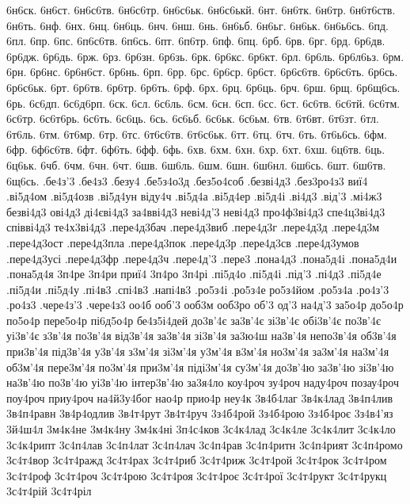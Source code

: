 {6н6ск. 6н6ст. 6н6с6тв. 6н6с6тр. 6н6с6ьк. 6н6с6ькй. 6нт. 6н6тк. 
6н6тр. 6н6т6ств. 6н6ть. 6нф. 6нх. 6нц. 6н6ць. 6нч. 
6нш. 6нь. 6н6ьб. 6н6ьг. 6н6ьк. 6н6ь6сь. 6пд. 6пл. 
6пр. 6пс. 6п6с6тв. 6п6сь. 6пт. 6п6тр. 6пф. 6пц. 
6рб. 6рв. 6рг. 6рд. 6р6дв. 6р6дж. 6р6дь. 6рж. 
6рз. 6р6зн. 6р6зь. 6рк. 6р6кс. 6р6кт. 6рл. 6р6ль. 
6р6л6ьз. 6рм. 6рн. 6р6нс. 6р6н6ст. 6р6нь. 6рп. 6рр. 
6рс. 6р6ср. 6р6ст. 6р6с6тв. 6р6с6ть. 6р6сь. 6р6с6ьк. 6рт. 
6р6тв. 6р6тр. 6р6ть. 6рф. 6рх. 6рц. 6р6ць. 6рч. 
6рш. 6рщ. 6р6щ6сь. 6рь. 6с6дп. 6с6д6рп. 6ск. 6сл. 
6с6ль. 6см. 6сн. 6сп. 6сс. 6ст. 6с6тв. 6с6тй. 
6с6тм. 6с6тр. 6с6т6рь. 6с6ть. 6с6ць. 6сь. 6с6ьб. 6с6ьк. 
6с6ьм. 6тв. 6т6вт. 6т6зт. 6тл. 6т6ль. 6тм. 6т6мр. 
6тр. 6тс. 6т6с6тв. 6т6с6ьк. 6тт. 6тц. 6тч. 6ть. 
6т6ь6сь. 6фм. 6фр. 6ф6с6тв. 6фт. 6ф6ть. 6фф. 6фь. 
6хв. 6хм. 6хн. 6хр. 6хт. 6хш. 6ц6тв. 6ць. 
6ц6ьк. 6чб. 6чм. 6чн. 6чт. 6шв. 6ш6ль. 6шм. 
6шн. 6ш6нл. 6ш6сь. 6шт. 6ш6тв. 6щ6сь. 
.бе4з'3
.бе4з3
.безу4
.бе5з4о3д
.без5о4соб
.безві4д3
.без3ро4з3
виї4
.ві5д4ом
.ві5д4озв
.ві5д4ун
віду4ч
.ві5д4а
.ві5д4ер
.ві5д4і
.ві4д3
.від'3
.мі4ж3
безві4д3
ові4д3
ді4єві4д3
за4вві4д3
неві4д'3
неві4д3
про4ф3ві4д3
спе4ц3ві4д3
співві4д3
те4х3ві4д3
.пере4д3бач
.пере4д3виб
.пере4д3г
.пере4д3д
.пере4д3м
.пере4д3ост
.пере4д3пла
.пере4д3пок
.пере4д3р
.пере4д3св
.пере4д3умов
.пере4д3усі
.пере4д3фр
.пере4д3ч
.пере4д'3
.пере3
.пона4д3
.пона5д4і
.пона5д4и
.пона5д4я
3п4ре
3п4ри
приї4
3п4ро
3п4рі
.пі5д4о
.пі5д4і
.під'3
.пі4д3
.пі5д4е
.пі5д4и
.пі5д4у
.пі4в3
.спі4в3
.напі4в3
.ро5з4і
.ро5з4е
ро5з4йом
.ро5з4а
.ро4з'3
.ро4з3
.чере4з'3
.чере4з3
оо4б
ооб'3
ооб3м
ооб3ро
об'3
од'3
на4д'3
за5о4р
до5о4р
по5о4р
пере5о4р
пі6д5о4р
бе4з5і4дей
до3в'4є
за3в'4є
зі3в'4є
обі3в'4є
по3в'4є
уі3в'4є
з3в'4я
по3в'4я
від3в'4я
за3в'4я
зі3в'4я
за3ю4ш
на3в'4я
непо3в'4я
об3в'4я
при3в'4я
під3в'4я
у3в'4я
з3м'4я
зі3м'4я
у3м'4я
в3м'4я
но3м'4я
за3м'4я
на3м'4я
об3м'4я
пере3м'4я
по3м'4я
при3м'4я
піді3м'4я
су3м'4я
до3в'4ю
за3в'4ю
зі3в'4ю
на3в'4ю
по3в'4ю
уі3в'4ю
інтер3в'4ю
за3я4ло
коу4роч
зу4роч
наду4роч
позау4роч
поу4роч
приу4роч
на4й3у4бог
нао4р
прио4р
неу4к
3в4б4лаг
3в4к4лад
3в4п4лив
3в4п4равн
3в4р4одлив
3в4т4рут
3в4т4руч
3з4б4рой
3з4б4рою
3з4б4роє
3з4в4'яз
3й4ш4л
3м4к4не
3м4к4ну
3м4к4ні
3п4с4ков
3с4к4лад
3с4к4ле
3с4к4лит
3с4к4ло
3с4к4рипт
3с4п4лав
3с4п4лат
3с4п4лач
3с4п4рав
3с4п4ритн
3с4п4рият
3с4п4ромо
3с4т4вор
3с4т4ражд
3с4т4рах
3с4т4риб
3с4т4риж
3с4т4рой
3с4т4рок
3с4т4ром
3с4т4роф
3с4т4роч
3с4т4рою
3с4т4роя
3с4т4роє
3с4т4рої
3с4т4рукт
3с4т4рукц
3с4т4рій
3с4т4ріл
}
